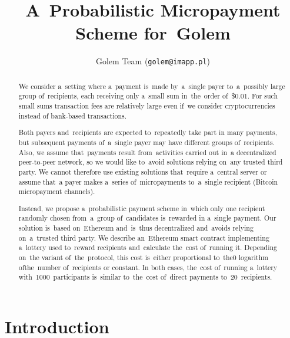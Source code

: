 \documentclass[a4paper]{article}
\title{A~Probabilistic Micropayment Scheme for~Golem}
\author{Golem Team (\texttt{golem@imapp.pl})}
\begin{document}
\maketitle

\begin{abstract}
    We consider a~setting where a~payment  is~made by~a~single payer
    to~a~possibly large group of~recipients, each receiving only a~small
    sum in~the~order of~\$$0.01$. For such small sums transaction fees are
    relatively large even if~we consider cryptocurrencies instead of
    bank-based transactions.

    Both payers and~recipients are expected to~repeatedly take part in
    many payments, but subsequent payments of~a~single payer may
    have different groups of~recipients. Also, we
    assume that~payments result from~activities carried out in~a
    decentralized peer-to-peer network, so we would like to~avoid
    solutions relying on~any trusted third party. We cannot therefore use
    existing solutions that~require a~central server or assume that~a
    payer makes a~series of~micropayments to~a~single recipient (Bitcoin
    micropayment channels).

    Instead, we propose a~probabilistic payment scheme in~which only one
    recipient randomly chosen from~a~group of~candidates  is~rewarded in
    a~single payment. Our solution  is~based on~Ethereum and~is~thus
    decentralized and~avoids relying on~a~trusted third party. We describe
    an~Ethereum smart contract implementing a~lottery used to~reward
    recipients and~calculate the~cost of~running it. Depending on~the
    variant of~the~protocol, this cost  is~either proportional to~the0
    logarithm ofthe~number of~recipients or constant. In both cases,
    the~cost of~running a~lottery with~1000~participants is~similar
    to~the~cost of~direct payments to~20~recipients.
\end{abstract}

\section{Introduction}
\end{document}
